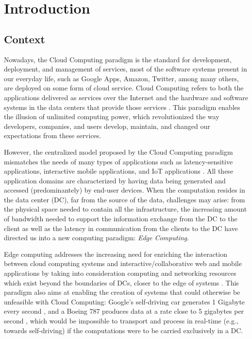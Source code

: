 


\chapter{Introduction}
\label{cha:introduction}



\section{Context} \label{sec:context}

Nowadays, the Cloud Computing paradigm is the standard for development, deployment, and management of services, most of the software systems present in our everyday life, such as Google Apps, Amazon, Twitter, among many others, are deployed on some form of cloud service. Cloud Computing refers to both the applications delivered as services over the Internet and the hardware and software systems in the data centers that provide those services \cite{10.1145/1721654.1721672}. This paradigm enables the illusion of unlimited computing power, which revolutionized the way developers, companies, and users develop, maintain, and changed our expectations from these services.

However, the centralized model proposed by the Cloud Computing paradigm mismatches the needs of many types of applications such as latency-sensitive applications, interactive mobile applications, and IoT applications \cite{10.1145/3154815}. All these application domains are characterized by having data being generated and accessed (predominantely) by end-user devices. When the computation resides in the data center (DC), far from the source of the data, challenges may arise: from the physical space needed to contain all the infrastructure, the increasing amount of bandwidth needed to support the information exchange from the DC to the client as well as the latency in communication from the clients to the DC have directed us into a new computing paradigm: \textit{Edge Computing}.

Edge computing addresses the increasing need for enriching the interaction between cloud computing systems and interactive/collaborative web and mobile applications \cite{10.1145/242857.242867} by taking into consideration computing and networking resources which exist beyond the boundaries of DCs, closer to the edge of systems \cite{Leitao2018} \cite{7488250}. This paradigm also aims at enabling the creation of systems that could otherwise be unfeasible with Cloud Computing: Google's self-driving car generates 1 Gigabyte every second \cite{datafloq}, and a Boeing 787 produces data at a rate close to 5 gigabytes per second \cite{finnegan_2013}, which would be impossible to transport and process in real-time (e.g., towards self-driving) if the computations were to be carried exclusively in a DC.

